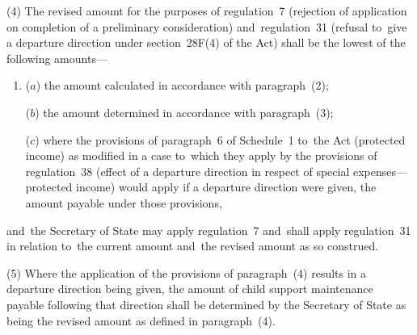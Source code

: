 \documentclass[12pt,a4paper]{article}
\begin{document}

(4) The revised amount for the purposes of regulation~7 (rejection of application on completion of a preliminary consideration) and~regulation~31 (refusal to~give a departure direction under section~28F(4) of the Act) shall be the lowest of the following amounts—
\begin{enumerate}\item[]
($a$) the amount calculated in accordance with paragraph~(2);

($b$) the amount determined in accordance with paragraph~(3);

($c$) where the provisions of paragraph~6 of Schedule~1 to~the Act (protected income) as modified in a case to~which they apply by the provisions of regulation~38 (effect of a departure direction in respect of special expenses—protected income) would apply if a departure direction were given, the amount payable under those provisions,
\end{enumerate}
and~the Secretary of State may apply regulation~7 and~shall apply regulation~31 in relation to~the current amount and~the revised amount as so construed.

(5) 
Where the application of the provisions of paragraph~(4) results in a departure direction being given, the amount of child support maintenance payable following that direction shall be determined by 
the Secretary of State  %
as being the revised amount as defined in paragraph~(4).
\end{document}
